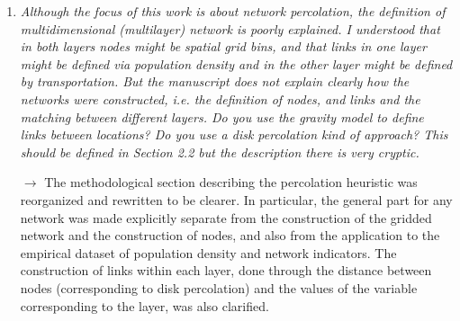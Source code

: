 \documentclass[11pt,a4paper,sans]{moderncv}        %
\begin{document}
\begin{enumerate}


\item \textit{Although the focus of this work is about network percolation, the definition of multidimensional (multilayer) network is poorly explained. I understood that in both layers nodes might be spatial grid bins, and that links in one layer might be defined via population density and in the other layer might be defined by transportation. But the manuscript does not explain clearly how the networks were constructed, i.e. the definition of nodes, and links and the matching between different layers. Do you use the gravity model to define links between locations? Do you use a disk percolation kind of approach? This should be defined in Section 2.2 but the description there is very cryptic.}

$\rightarrow$ The methodological section describing the percolation heuristic was reorganized and rewritten to be clearer. In particular, the general part for any network was made explicitly separate from the construction of the gridded network and the construction of nodes, and also from the application to the empirical dataset of population density and network indicators. The construction of links within each layer, done through the distance between nodes (corresponding to disk percolation) and the values of the variable corresponding to the layer, was also clarified.


\medskip


\end{enumerate}
\end{document}
